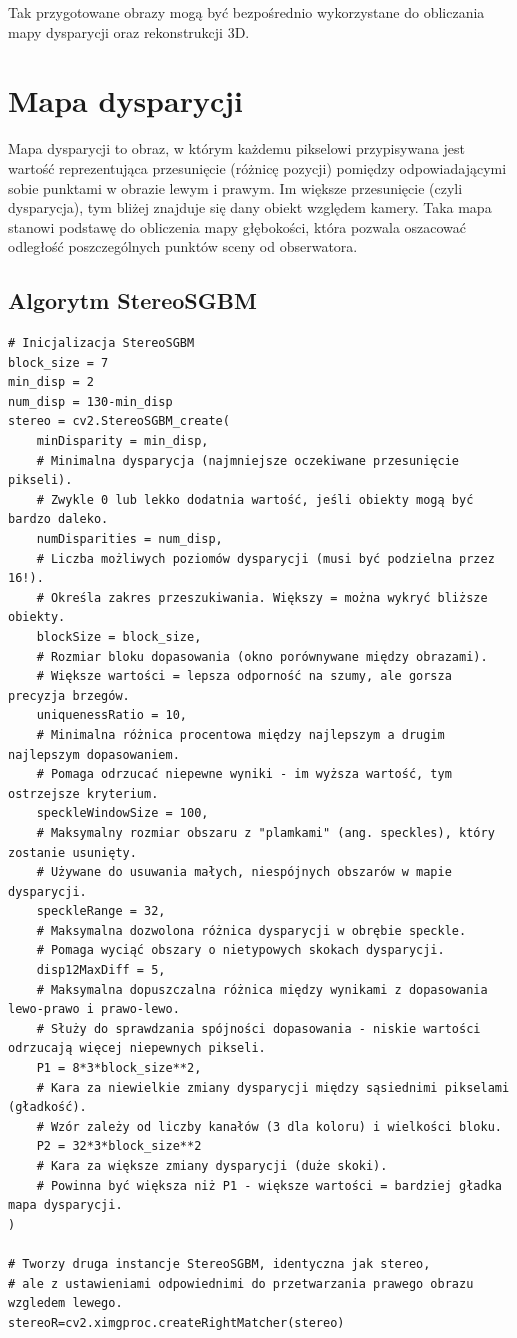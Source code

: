 \documentclass[magisterska]{pracadypl}
\begin{document}
Tak przygotowane obrazy mogą być bezpośrednio wykorzystane do obliczania mapy dysparycji oraz rekonstrukcji 3D.

\section{Mapa dysparycji}

Mapa dysparycji\cite{disparity} to obraz, w którym każdemu pikselowi przypisywana jest wartość reprezentująca przesunięcie (różnicę pozycji) pomiędzy odpowiadającymi sobie punktami w obrazie lewym i prawym. Im większe przesunięcie (czyli dysparycja), tym bliżej znajduje się dany obiekt względem kamery. Taka mapa stanowi podstawę do obliczenia mapy głębokości, która pozwala oszacować odległość poszczególnych punktów sceny od obserwatora.

\subsection*{Algorytm StereoSGBM}

\begin{lstlisting}[style=mypython]
# Inicjalizacja StereoSGBM
block_size = 7
min_disp = 2
num_disp = 130-min_disp
stereo = cv2.StereoSGBM_create(
    minDisparity = min_disp,
    # Minimalna dysparycja (najmniejsze oczekiwane przesunięcie pikseli).
    # Zwykle 0 lub lekko dodatnia wartość, jeśli obiekty mogą być bardzo daleko.
    numDisparities = num_disp,
    # Liczba możliwych poziomów dysparycji (musi być podzielna przez 16!).
    # Określa zakres przeszukiwania. Większy = można wykryć bliższe obiekty.
    blockSize = block_size,
    # Rozmiar bloku dopasowania (okno porównywane między obrazami).
    # Większe wartości = lepsza odporność na szumy, ale gorsza precyzja brzegów.
    uniquenessRatio = 10,
    # Minimalna różnica procentowa między najlepszym a drugim najlepszym dopasowaniem.
    # Pomaga odrzucać niepewne wyniki - im wyższa wartość, tym ostrzejsze kryterium.
    speckleWindowSize = 100,
    # Maksymalny rozmiar obszaru z "plamkami" (ang. speckles), który zostanie usunięty.
    # Używane do usuwania małych, niespójnych obszarów w mapie dysparycji.
    speckleRange = 32,
    # Maksymalna dozwolona różnica dysparycji w obrębie speckle.
    # Pomaga wyciąć obszary o nietypowych skokach dysparycji.
    disp12MaxDiff = 5,
    # Maksymalna dopuszczalna różnica między wynikami z dopasowania lewo-prawo i prawo-lewo.
    # Służy do sprawdzania spójności dopasowania - niskie wartości odrzucają więcej niepewnych pikseli.
    P1 = 8*3*block_size**2,
    # Kara za niewielkie zmiany dysparycji między sąsiednimi pikselami (gładkość).
    # Wzór zależy od liczby kanałów (3 dla koloru) i wielkości bloku.
    P2 = 32*3*block_size**2
    # Kara za większe zmiany dysparycji (duże skoki).
    # Powinna być większa niż P1 - większe wartości = bardziej gładka mapa dysparycji.
)

# Tworzy druga instancje StereoSGBM, identyczna jak stereo,
# ale z ustawieniami odpowiednimi do przetwarzania prawego obrazu wzgledem lewego.
stereoR=cv2.ximgproc.createRightMatcher(stereo)
\end{lstlisting}
\end{document}
